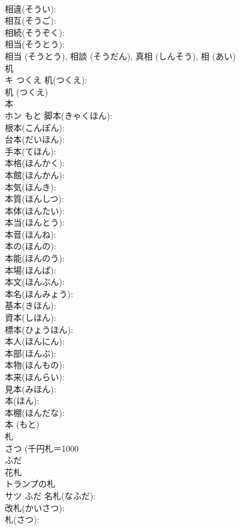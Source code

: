 \documentclass[8pt]{extreport}
\begin{document}
\begin{CJK}{UTF8}{min}
\\	相違(そうい): 
\\	相互(そうご): 
\\	相続(そうぞく): 
\\	相当(そうとう): 
\\	相当 (そうとう), 相談 (そうだん), 真相 (しんそう), 相 (あい)
\\	机			
\\	キ	つくえ	机(つくえ): 
\\	机 (つくえ)
\\	本			
\\	ホン	もと	脚本(きゃくほん): 
\\	根本(こんぽん): 
\\	台本(だいほん): 
\\	手本(てほん): 
\\	本格(ほんかく): 
\\	本館(ほんかん): 
\\	本気(ほんき): 
\\	本質(ほんしつ): 
\\	本体(ほんたい): 
\\	本当(ほんとう): 
\\	本音(ほんね): 
\\	本の(ほんの): 
\\	本能(ほんのう): 
\\	本場(ほんば): 
\\	本文(ほんぶん): 
\\	本名(ほんみょう): 
\\	基本(きほん): 
\\	資本(しほん): 
\\	標本(ひょうほん): 
\\	本人(ほんにん): 
\\	本部(ほんぶ): 
\\	本物(ほんもの): 
\\	本来(ほんらい): 
\\	見本(みほん): 
\\	本(ほん): 
\\	本棚(ほんだな): 
\\	本 (もと)
\\	札			
\\	さつ (千円札＝1000 
\\	ふだ 
\\	花札 
\\	トランプの札 
\\	サツ	ふだ	名札(なふだ): 
\\	改札(かいさつ): 
\\	札(さつ): 

\end{CJK}
\end{document}
